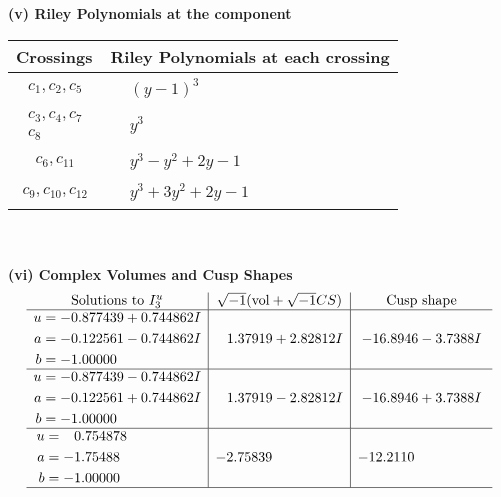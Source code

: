 \documentclass[1p]{elsarticle_modified}
\theoremstyle{definition}
\newcommand{\I}{\sqrt{-1}}
\begin{document}
\newpage\renewcommand{\arraystretch}{1}
\flushleft \textbf{(v) Riley Polynomials at the component}\newline \\
\begin{tabular}{m{50pt}|m{274pt}}
Crossings & \hspace{64pt}Riley Polynomials at each crossing \\
\hline $$\begin{aligned}c_{1},c_{2},c_{5}\end{aligned}$$&$\begin{aligned}
&(y-1)^3
\end{aligned}$\\
\hline $$\begin{aligned}c_{3},c_{4},c_{7}\\c_{8}\end{aligned}$$&$\begin{aligned}
&y^3
\end{aligned}$\\
\hline $$\begin{aligned}c_{6},c_{11}\end{aligned}$$&$\begin{aligned}
&y^3- y^2+2 y-1
\end{aligned}$\\
\hline $$\begin{aligned}c_{9},c_{10},c_{12}\end{aligned}$$&$\begin{aligned}
&y^3+3 y^2+2 y-1
\end{aligned}$\\
\hline
\end{tabular}\\~\\
\newpage\flushleft \textbf{(vi) Complex Volumes and Cusp Shapes}
$$\begin{array}{c|c|c}  
\text{Solutions to }I^u_{3}& \I (\text{vol} + \sqrt{-1}CS) & \text{Cusp shape}\\
 \hline 
\begin{aligned}
u &= -0.877439 + 0.744862 I \\
a &= -0.122561 - 0.744862 I \\
b &= -1.00000\phantom{ +0.000000I}\end{aligned}
 & \phantom{-}1.37919 + 2.82812 I & -16.8946 - 3.7388 I \\ \hline\begin{aligned}
u &= -0.877439 - 0.744862 I \\
a &= -0.122561 + 0.744862 I \\
b &= -1.00000\phantom{ +0.000000I}\end{aligned}
 & \phantom{-}1.37919 - 2.82812 I & -16.8946 + 3.7388 I \\ \hline\begin{aligned}
u &= \phantom{-}0.754878\phantom{ +0.000000I} \\
a &= -1.75488\phantom{ +0.000000I} \\
b &= -1.00000\phantom{ +0.000000I}\end{aligned}
 & -2.75839\phantom{ +0.000000I} & -12.2110\phantom{ +0.000000I}\\
 \hline 
 \end{array}$$\newpage
\end{document}
